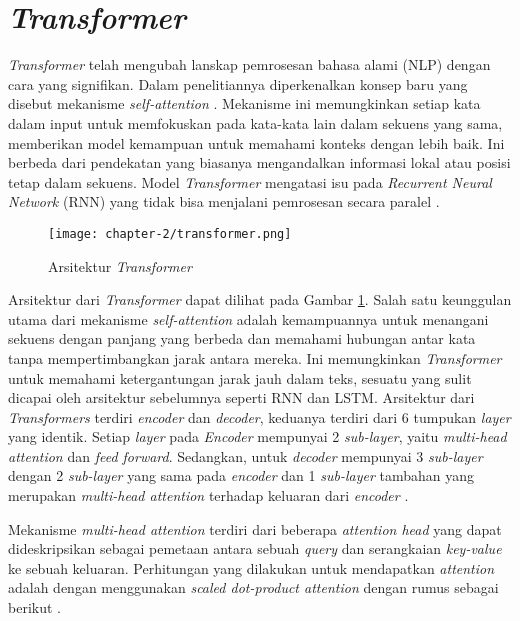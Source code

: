 \section{\textit{Transformer}}
\label{sec:transformer}

\textit{Transformer} telah mengubah lanskap pemrosesan bahasa alami (NLP) dengan cara yang signifikan. Dalam penelitiannya diperkenalkan konsep baru yang disebut mekanisme \textit{self-attention} \parencite{transformers}. Mekanisme ini memungkinkan setiap kata dalam input untuk memfokuskan pada kata-kata lain dalam sekuens yang sama, memberikan model kemampuan untuk memahami konteks dengan lebih baik. Ini berbeda dari pendekatan yang biasanya mengandalkan informasi lokal atau posisi tetap dalam sekuens. Model \textit{Transformer} mengatasi isu pada \textit{Recurrent Neural Network} (RNN) yang tidak bisa menjalani pemrosesan secara paralel \parencite{transformers}.

\begin{figure}[ht]
    \vspace{0.25cm}
    \centering
    \texttt{[image: chapter-2/transformer.png]}
    \caption{Arsitektur \textit{Transformer} \parencite{transformers}}
    \label{fig:transformer}
\end{figure}

Arsitektur dari \textit{Transformer} dapat dilihat pada Gambar \ref{fig:transformer}. Salah satu keunggulan utama dari mekanisme \textit{self-attention} adalah kemampuannya untuk menangani sekuens dengan panjang yang berbeda dan memahami hubungan antar kata tanpa mempertimbangkan jarak antara mereka. Ini memungkinkan \textit{Transformer} untuk memahami ketergantungan jarak jauh dalam teks, sesuatu yang sulit dicapai oleh arsitektur sebelumnya seperti RNN dan LSTM. Arsitektur dari \textit{Transformers} terdiri \textit{encoder} dan \textit{decoder}, keduanya terdiri dari 6 tumpukan \textit{layer} yang identik. Setiap \textit{layer} pada \textit{Encoder} mempunyai 2 \textit{sub-layer}, yaitu \textit{multi-head attention} dan \textit{feed forward}. Sedangkan, untuk \textit{decoder} mempunyai 3 \textit{sub-layer} dengan 2 \textit{sub-layer} yang sama pada \textit{encoder} dan 1 \textit{sub-layer} tambahan yang merupakan \textit{multi-head attention} terhadap keluaran dari \textit{encoder} \parencite{transformers}.

Mekanisme \textit{multi-head attention} terdiri dari beberapa \textit{attention head} yang dapat dideskripsikan sebagai pemetaan antara sebuah \textit{query} dan serangkaian \textit{key-value} ke sebuah keluaran. Perhitungan yang dilakukan untuk mendapatkan \textit{attention} adalah dengan menggunakan \textit{scaled dot-product attention} dengan rumus sebagai berikut \parencite{transformers}.

